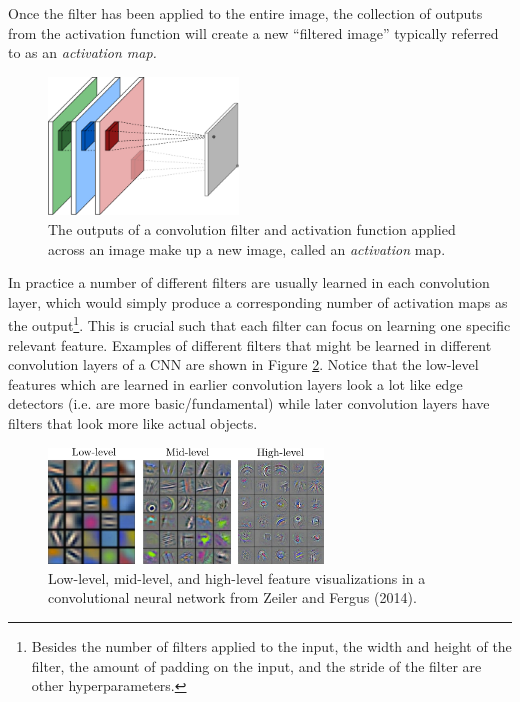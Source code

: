 Once the filter has been applied to the entire image, the collection of outputs from the activation function will create a new ``filtered image'' typically referred to as an \textit{activation map.}
\begin{figure}[ht] 
\begin{center}
\includegraphics[width=0.45\textwidth]{tex/figs/ch12_figs/convolution2.png}
\caption{The outputs of a convolution filter and activation function applied across an image make up a new image, called an \textit{activation} map.}
\label{fig:activations}
\end{center}
\end{figure}
In practice a number of different filters are usually learned in each convolution layer, which would simply produce a corresponding number of activation maps as the output\footnote{Besides the number of filters applied to the input, the width and height of the filter, the amount of padding on the input, and the stride of the filter are other hyperparameters.}. This is crucial such that each filter can focus on learning one specific relevant feature. Examples of different filters that might be learned in different convolution layers of a CNN are shown in Figure \ref{fig:convfeatures}\cite{ZeilerFergus2014}. Notice that the low-level features which are learned in earlier convolution layers look a lot like edge detectors (i.e. are more basic/fundamental) while later convolution layers have filters that look more like actual objects.
\begin{figure}[ht] 
\begin{center}
\includegraphics[width=0.65\textwidth]{tex/figs/ch12_figs/features.png}
\caption{Low-level, mid-level, and high-level feature visualizations in a convolutional neural network from Zeiler and Fergus (2014)\nocite{ZeilerFergus2014}.}
\label{fig:convfeatures}
\end{center}
\end{figure}

